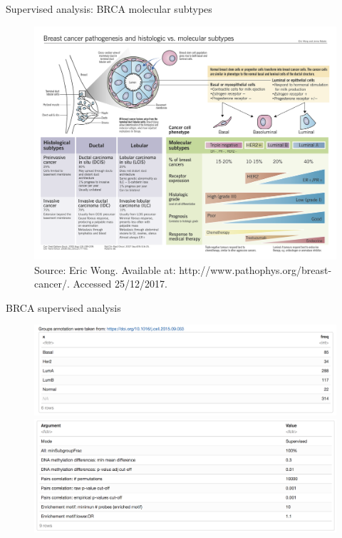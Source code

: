 \documentclass[slidestop,compress,11pt,xcolor=dvipsnames]{beamer}
\begin{document}
\begin{frame}[plain]{Supervised analysis: BRCA molecular subtypes}
\vspace*{-0.45cm}
 \begin{figure}[ht!]
  \centering
  \includegraphics[width=1.0\textwidth]{ELMER/breastcancer-subtypes.png}\tiny{\\Source: Eric Wong. Available at: http://www.pathophys.org/breast-cancer/. Accessed 25/12/2017.}
 \end{figure}
\end{frame}

\begin{frame}{BRCA supervised analysis}

 \begin{figure}[ht!]
  \centering
  \includegraphics[width=1.0\textwidth]{ELMER/groups.png}
  \includegraphics[width=1.0\textwidth]{ELMER/arguments.png}
 \end{figure}
\end{frame}
\end{document}
